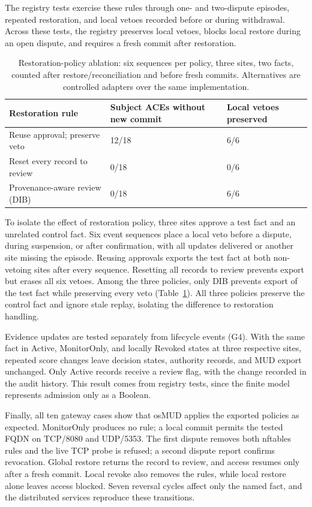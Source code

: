\documentclass[journal]{IEEEtran}
\theoremstyle{definition}
\begin{document}
The registry tests exercise these rules through one- and two-dispute episodes, repeated restoration, and local vetoes recorded before or during withdrawal. Across these tests, the registry preserves local vetoes, blocks local restore during an open dispute, and requires a fresh commit after restoration.

\begin{table}[t]
\centering
\caption{Restoration-policy ablation: six sequences per policy, three sites, two facts, counted after restore/reconciliation and before fresh commits. Alternatives are controlled adapters over the same implementation.}
\label{tab:comparison}
\scriptsize
\begin{tabular}{@{}p{3.0cm}p{1.9cm}p{1.9cm}@{}}
\toprule
Restoration rule & Subject ACEs without new commit & Local vetoes preserved \\
\midrule
Reuse approval; preserve veto & 12/18 & 6/6 \\
Reset every record to review & 0/18 & 0/6 \\
Provenance-aware review (DIB) & 0/18 & 6/6 \\
\bottomrule
\end{tabular}
\end{table}



To isolate the effect of restoration policy, three sites approve a test fact and an unrelated control fact. Six event sequences place a local veto before a dispute, during suspension, or after confirmation, with all updates delivered or another site missing the episode. Reusing approvals exports the test fact at both non-vetoing sites after every sequence. Resetting all records to review prevents export but erases all six vetoes. Among the three policies, only DIB prevents export of the test fact while preserving every veto (Table~\ref{tab:comparison}). All three policies preserve the control fact and ignore stale replay, isolating the difference to restoration handling.

Evidence updates are tested separately from lifecycle events (G4). With the same fact in Active, MonitorOnly, and locally Revoked states at three respective sites, repeated score changes leave decision states, authority records, and MUD export unchanged. Only Active records receive a review flag, with the change recorded in the audit history. This result comes from registry tests, since the finite model represents admission only as a Boolean.

Finally, all ten gateway cases show that osMUD applies the exported policies as expected. MonitorOnly produces no rule; a local commit permits the tested FQDN on TCP/8080 and UDP/5353. The first dispute removes both nftables rules and the live TCP probe is refused; a second dispute report confirms revocation. Global restore returns the record to review, and access resumes only after a fresh commit. Local revoke also removes the rules, while local restore alone leaves access blocked. Seven reversal cycles affect only the named fact, and the distributed services reproduce these transitions.
\end{document}
